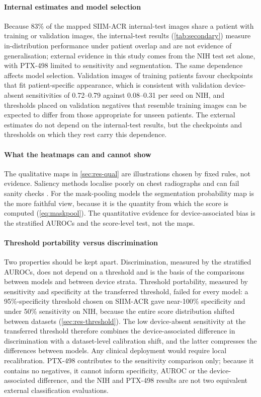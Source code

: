 \documentclass{ieeeaccess}
\begin{document}
\paragraph{Internal estimates and model selection}
Because 83\% of the mapped SIIM-ACR internal-test images share a patient with training or validation images, the internal-test results (\cref{tab:secondary}) measure in-distribution performance under patient overlap and are not evidence of generalisation; external evidence in this study comes from the NIH test set alone, with PTX-498 limited to sensitivity and segmentation. The same dependence affects model selection. Validation images of training patients favour checkpoints that fit patient-specific appearance, which is consistent with validation device-absent sensitivities of 0.72--0.79 against 0.08--0.31 per seed on NIH, and thresholds placed on validation negatives that resemble training images can be expected to differ from those appropriate for unseen patients. The external estimates do not depend on the internal-test results, but the checkpoints and thresholds on which they rest carry this dependence.

\paragraph{What the heatmaps can and cannot show}
The qualitative maps in \cref{sec:res-qual} are illustrations chosen by fixed rules, not evidence. Saliency methods localise poorly on chest radiographs and can fail sanity checks \cite{saporta2022saliency,arun2021saliency}. For the mask-pooling models the segmentation probability map is the more faithful view, because it is the quantity from which the score is computed (\cref{eq:maskpool}). The quantitative evidence for device-associated bias is the stratified AUROCs and the score-level test, not the maps.

\paragraph{Threshold portability versus discrimination}
Two properties should be kept apart. Discrimination, measured by the stratified AUROCs, does not depend on a threshold and is the basis of the comparisons between models and between device strata. Threshold portability, measured by sensitivity and specificity at the transferred threshold, failed for every model: a 95\%-specificity threshold chosen on SIIM-ACR gave near-100\% specificity and under 50\% sensitivity on NIH, because the entire score distribution shifted between datasets (\cref{sec:res-threshold}). The low device-absent sensitivity at the transferred threshold therefore combines the device-associated difference in discrimination with a dataset-level calibration shift, and the latter compresses the differences between models. Any clinical deployment would require local recalibration. PTX-498 contributes to the sensitivity comparison only; because it contains no negatives, it cannot inform specificity, AUROC or the device-associated difference, and the NIH and PTX-498 results are not two equivalent external classification evaluations.
\end{document}
